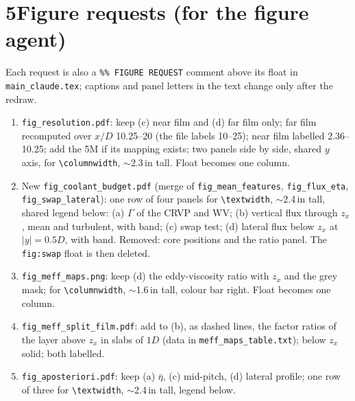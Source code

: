 \documentclass[10pt]{article}
\begin{document}
\section*{5\quad Figure requests (for the figure agent)}
Each request is also a \texttt{\%\% FIGURE REQUEST} comment above its float in \texttt{main\_claude.tex}; captions and
panel letters in the text change only after the redraw.
\begin{enumerate}[label=\arabic*.]
\item \texttt{fig\_resolution.pdf}: keep (c) near film and (d) far film only; far film recomputed over $x/D$
  10.25--20 (the file labels 10--25); near film labelled 2.36--10.25; add the 5M if its mapping exists; two panels
  side by side, shared $y$ axis, for \texttt{\textbackslash columnwidth}, $\sim$2.3\,in tall. Float becomes one column.
\item New \texttt{fig\_coolant\_budget.pdf} (merge of \texttt{fig\_mean\_features}, \texttt{fig\_flux\_eta},
  \texttt{fig\_swap\_lateral}): one row of four panels for \texttt{\textbackslash textwidth}, $\sim$2.4\,in tall,
  shared legend below: (a) $\Gamma$ of the CRVP and WV; (b) vertical flux through $z_x$, mean and turbulent, with
  band; (c) swap test; (d) lateral flux below $z_x$ at $|y|=0.5D$, with band. Removed: core positions and the
  ratio panel. The \texttt{fig:swap} float is then deleted.
\item \texttt{fig\_meff\_maps.png}: keep (d) the eddy-viscosity ratio with $z_x$ and the grey mask; for
  \texttt{\textbackslash columnwidth}, $\sim$1.6\,in tall, colour bar right. Float becomes one column.
\item \texttt{fig\_meff\_split\_film.pdf}: add to (b), as dashed lines, the factor ratios of the layer above $z_x$
  in slabs of $1D$ (data in \texttt{meff\_maps\_table.txt}); below $z_x$ solid; both labelled.
\item \texttt{fig\_aposteriori.pdf}: keep (a) $\bar\eta$, (c) mid-pitch, (d) lateral profile; one row of three for
  \texttt{\textbackslash textwidth}, $\sim$2.4\,in tall, legend below.
\end{enumerate}

\end{document}
